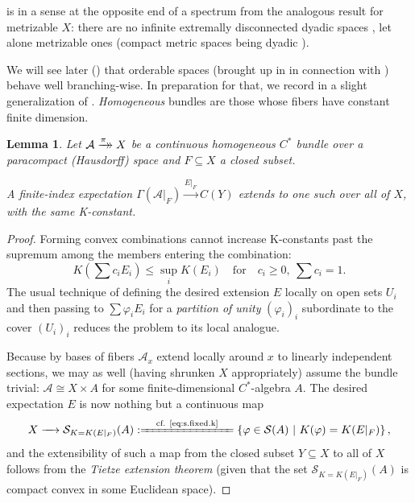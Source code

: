 \documentclass[11pt,leqno]{article}
\theoremstyle{plain}
\newtheorem{lemma}{Lemma}[section]
\theoremstyle{plain}
\theoremstyle{plain}
\numberwithin{equation}{section}
\theoremstyle{nonumberplain}
\newtheorem{proof}{Proof}
\newcommand\cA{{\mathcal A}}
\newcommand\cS{{\mathcal S}}
\newcommand\1{{\bf 1}}
\newcommand{\xrightarrowdbl}[2][]{%
  \xrightarrow[#1]{#2}\mathrel{\mkern-14mu}\rightarrow
}
\begin{document}
 is in a sense at the opposite end of a spectrum from the analogous result \cite[Theorem 2.12]{2409.03531v1} for metrizable $X$: there are no infinite extremally disconnected dyadic spaces \cite[Theorem 4]{zbMATH03199381}, let alone metrizable ones (compact metric spaces being dyadic \cite[Theorem 8.3.6]{sem_ban-sp-cont}). 

We will see later () that orderable spaces (brought up in  in connection with ) behave well branching-wise. In preparation for that, we record in  a slight generalization of \cite[Proposition 3.4]{bg_cx-exp}. {\it Homogeneous} bundles \cite[Definition 2.2]{dupre_hilbund-1} are those whose fibers have constant finite dimension.


\begin{lemma}\label{le:ext.same.k}
  Let $\cA\xrightarrowdbl{\pi}X$ be a continuous homogeneous $C^*$ bundle over a paracompact (Hausdorff) space and $F\subseteq X$ a closed subset.

  A finite-index expectation $\Gamma\left(\cA|_F\right)\xrightarrow{E|_F}C(Y)$ extends to one such over all of $X$, with the same K-constant. 
\end{lemma}
\begin{proof}
  Forming convex combinations cannot increase K-constants past the supremum among the members entering the combination:
  \begin{equation*}
    K\left(\sum c_i E_i\right)\le \sup_i K(E_i)
    \quad\text{for}\quad
    c_i\ge 0,\ \sum c_i=1. 
  \end{equation*}
  The usual technique of defining the desired extension $E$ locally on open sets $U_i$ and then passing to $\sum \varphi_i E_i$ for a {\it partition of unity} \cite[Theorem 5.1.9]{eng_top_1989} $(\varphi_i)_i$ subordinate to the cover $(U_i)_i$ reduces the problem to its local analogue. 
  
  Because by \cite[Theorem 5.1]{hk_shv-bdl} bases of fibers $\cA_x$ extend locally around $x$ to linearly independent \cite[p.231, Remarque]{dd} sections, we may as well (having shrunken $X$ appropriately) assume the bundle trivial: $\cA\cong X\times A$ for some finite-dimensional $C^*$-algebra $A$. The desired expectation $E$ is now nothing but a continuous map
  \begin{equation*}
    X
    \xrightarrow{\quad}
    \cS_{K=K(E|_F)}(A)
    :\xlongequal{\quad\text{cf. \Cref{eq:s.fixed.k}}\quad}
    \left\{\varphi\in \cS(A)\ |\ K(\varphi)=K(E|_F)\right\},
  \end{equation*}
  and the extensibility of such a map from the closed subset $Y\subseteq X$ to all of $X$ follows from the {\it Tietze extension theorem} \cite[Theorem 15.8]{wil_top} (given that the set $\cS_{K=K(E|_F)}(A)$ is compact convex in some Euclidean space). 
\end{proof}
\end{document}
